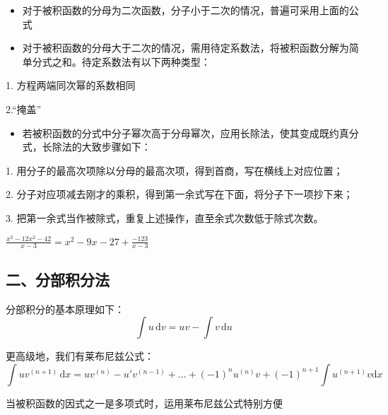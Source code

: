 \begin{itemize}
\item 对于被积函数的分母为二次函数，分子小于二次的情况，普遍可采用上面的公式
\end{itemize}
\begin{itemize}
\item 对于被积函数的分母大于二次的情况，需用待定系数法，将被积函数分解为简单分式之和。待定系数法有以下两种类型：
\end{itemize}
1. 方程两端同次幂的系数相同

2.“掩盖”

\begin{itemize}
\item 若被积函数的分式中分子幂次高于分母幂次，应用长除法，使其变成既约真分式，长除法的大致步骤如下：
\end{itemize}

1. 用分子的最高次项除以分母的最高次项，得到首商，写在横线上对应位置；

2. 分子对应项减去刚才的乘积，得到第一余式写在下面，将分子下一项抄下来；

3. 把第一余式当作被除式，重复上述操作，直至余式次数低于除式次数。
\begin{example}{}
$\displaystyle{\frac{x^3-12x^2-42}{x-3}=x^2-9x-27+\frac{-123}{x-3}}$ 
\end{example}
\subsection{二、分部积分法}
分部积分的基本原理如下：
$$\int u\,\mathrm{d}v=uv-\int v\,\mathrm{d}u$$

更高级地，我们有莱布尼兹公式：
$$\int uv^{(n+1)}\,\mathrm{d}x=uv^{(n)}-u'v^{(n-1)}+...+(-1)^nu^{(n)}v+(-1)^{n+1}\int u^{(n+1)}v\mathrm{d}x$$

当被积函数的因式之一是多项式时，运用莱布尼兹公式特别方便

